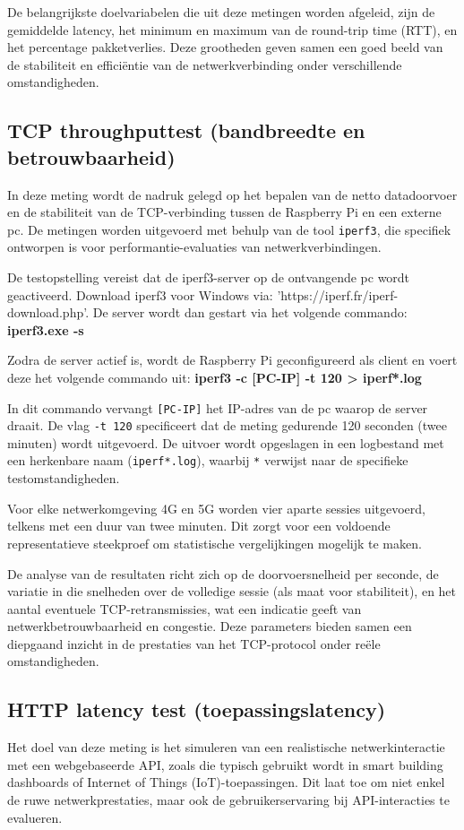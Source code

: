 De belangrijkste doelvariabelen die uit deze metingen worden afgeleid, zijn de gemiddelde latency, het minimum en maximum van de round-trip time (RTT), en het percentage pakketverlies. Deze grootheden geven samen een goed beeld van de stabiliteit en efficiëntie van de netwerkverbinding onder verschillende omstandigheden.

\subsection{TCP throughputtest (bandbreedte en betrouwbaarheid)}
In deze meting wordt de nadruk gelegd op het bepalen van de netto datadoorvoer en de stabiliteit van de TCP-verbinding tussen de Raspberry Pi en een externe pc. De metingen worden uitgevoerd met behulp van de tool \texttt{iperf3}, die specifiek ontworpen is voor performantie-evaluaties van netwerkverbindingen.

De testopstelling vereist dat de iperf3-server op de ontvangende pc wordt geactiveerd. Download iperf3 voor Windows via: 'https://iperf.fr/iperf-download.php'. De server wordt dan gestart via het volgende commando: \textbf{iperf3.exe -s} 

Zodra de server actief is, wordt de Raspberry Pi geconfigureerd als client en voert deze het volgende commando uit: \textbf{iperf3 -c [PC-IP] -t 120 > iperf*.log}

In dit commando vervangt \texttt{[PC-IP]} het IP-adres van de pc waarop de server draait. De vlag \texttt{-t 120} specificeert dat de meting gedurende 120 seconden (twee minuten) wordt uitgevoerd. De uitvoer wordt opgeslagen in een logbestand met een herkenbare naam (\texttt{iperf*.log}), waarbij \texttt{*} verwijst naar de specifieke testomstandigheden.

Voor elke netwerkomgeving 4G en 5G worden vier aparte sessies uitgevoerd, telkens met een duur van twee minuten. Dit zorgt voor een voldoende representatieve steekproef om statistische vergelijkingen mogelijk te maken.

De analyse van de resultaten richt zich op de doorvoersnelheid per seconde, de variatie in die snelheden over de volledige sessie (als maat voor stabiliteit), en het aantal eventuele TCP-retransmissies, wat een indicatie geeft van netwerkbetrouwbaarheid en congestie. Deze parameters bieden samen een diepgaand inzicht in de prestaties van het TCP-protocol onder reële omstandigheden.


\subsection{HTTP latency test (toepassingslatency)}
Het doel van deze meting is het simuleren van een realistische netwerkinteractie met een webgebaseerde API, zoals die typisch gebruikt wordt in smart building dashboards of Internet of Things (IoT)-toepassingen. Dit laat toe om niet enkel de ruwe netwerkprestaties, maar ook de gebruikerservaring bij API-interacties te evalueren.

